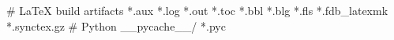 # LaTeX build artifacts
*.aux
*.log
*.out
*.toc
*.bbl
*.blg
*.fls
*.fdb_latexmk
*.synctex.gz
# Python
__pycache__/
*.pyc
